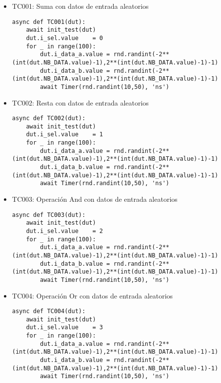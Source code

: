 \begin{itemize}
    \item TC001: Suma con datos de entrada aleatorios
        \begin{verbatim}
async def TC001(dut):
    await init_test(dut)
    dut.i_sel.value    = 0
    for _ in range(100):
        dut.i_data_a.value = rnd.randint(-2**(int(dut.NB_DATA.value)-1),2**(int(dut.NB_DATA.value)-1)-1)
        dut.i_data_b.value = rnd.randint(-2**(int(dut.NB_DATA.value)-1),2**(int(dut.NB_DATA.value)-1)-1)
        await Timer(rnd.randint(10,50), 'ns')
        \end{verbatim}

    \item TC002: Resta con datos de entrada aleatorios
        \begin{verbatim}
async def TC002(dut):
    await init_test(dut)
    dut.i_sel.value    = 1
    for _ in range(100):
        dut.i_data_a.value = rnd.randint(-2**(int(dut.NB_DATA.value)-1),2**(int(dut.NB_DATA.value)-1)-1)
        dut.i_data_b.value = rnd.randint(-2**(int(dut.NB_DATA.value)-1),2**(int(dut.NB_DATA.value)-1)-1)
        await Timer(rnd.randint(10,50), 'ns')
        \end{verbatim}

    \item TC003: Operación And  con datos de entrada aleatorios
        \begin{verbatim}
async def TC003(dut):
    await init_test(dut)
    dut.i_sel.value    = 2
    for _ in range(100):
        dut.i_data_a.value = rnd.randint(-2**(int(dut.NB_DATA.value)-1),2**(int(dut.NB_DATA.value)-1)-1)
        dut.i_data_b.value = rnd.randint(-2**(int(dut.NB_DATA.value)-1),2**(int(dut.NB_DATA.value)-1)-1)
        await Timer(rnd.randint(10,50), 'ns')
        \end{verbatim}

    \item TC004: Operación Or con datos de entrada aleatorios
        \begin{verbatim}
async def TC004(dut):
    await init_test(dut)
    dut.i_sel.value    = 3
    for _ in range(100):
        dut.i_data_a.value = rnd.randint(-2**(int(dut.NB_DATA.value)-1),2**(int(dut.NB_DATA.value)-1)-1)
        dut.i_data_b.value = rnd.randint(-2**(int(dut.NB_DATA.value)-1),2**(int(dut.NB_DATA.value)-1)-1)
        await Timer(rnd.randint(10,50), 'ns')
        \end{verbatim}


\end{itemize}
